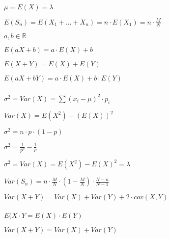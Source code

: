 \documentclass[10pt,a4paper,landscape]{article}
\begin{document}
\begin{multicols*}{4}
\parbox{\columnwidth}{\centering $\mu = E(X) = \lambda$}

\parbox{\columnwidth}{\centering $E(S_n) = E(X_1 + ... + X_n) = n \cdot E(X_1) = n \cdot \frac{M}{N}$}

\parbox{\columnwidth}{\centering $a, b \in \mathbb{R}$}
\parbox{\columnwidth}{\centering $E(aX + b) = a \cdot E(X) + b$}
\parbox{\columnwidth}{\centering $E(X + Y) = E(X) + E(Y)$}
\parbox{\columnwidth}{\centering $E(aX + bY) = a \cdot E(X) + b \cdot E(Y)$}

\subsubsection{}

\parbox{\columnwidth}{\centering $\sigma^2 = Var(X) = \sum (x_i - \mu)^2 \cdot p_i$}

\parbox{\columnwidth}{\centering $Var(X) = E(X^2) - (E(X))^2$}

\parbox{\columnwidth}{\centering $\sigma^2 = n \cdot p \cdot (1-p)$}

\parbox{\columnwidth}{\centering $\sigma^2 = \frac{1}{p^2} - \frac{1}{p}$}

\parbox{\columnwidth}{\centering $\sigma^2 = Var(X) = E(X^2) - E(X)^2 = \lambda$}

\parbox{\columnwidth}{\centering $Var(S_n) = n \cdot \frac{M}{N} \cdot (1 - \frac{M}{N}) \cdot \frac{N-n}{N-1}$}

\parbox{\columnwidth}{\centering $Var(X + Y) = Var(X) + Var(Y) + 2 \cdot cov(X,Y)$}

\subsubsection{}

\parbox{\columnwidth}{\centering $E(X \cdot Y = E(X) \cdot E(Y)$}
\parbox{\columnwidth}{\centering $Var(X + Y) = Var(X) + Var(Y)$}

\end{multicols*}
\end{document}
